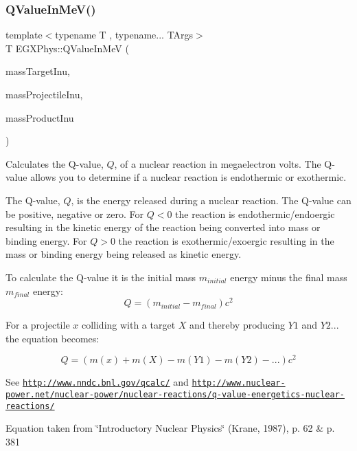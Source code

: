\subsubsection{\texorpdfstring{Q\+Value\+In\+Me\+V()}{QValueInMeV()}}
{\footnotesize\ttfamily template$<$typename T , typename... T\+Args$>$ \\
T E\+G\+X\+Phys\+::\+Q\+Value\+In\+MeV (\begin{DoxyParamCaption}\item[{const T \&}]{mass\+Target\+Inu,  }\item[{const T \&}]{mass\+Projectile\+Inu,  }\item[{const T\+Args \&...}]{mass\+Product\+Inu }\end{DoxyParamCaption})}



Calculates the Q-\/value, $Q$, of a nuclear reaction in megaelectron volts. The Q-\/value allows you to determine if a nuclear reaction is endothermic or exothermic. 

The Q-\/value, $Q$, is the energy released during a nuclear reaction. The Q-\/value can be positive, negative or zero. For $Q < 0$ the reaction is endothermic/endoergic resulting in the kinetic energy of the reaction being converted into mass or binding energy. For $Q > 0$ the reaction is exothermic/exoergic resulting in the mass or binding energy being released as kinetic energy.

To calculate the Q-\/value it is the initial mass $m_{initial}$ energy minus the final mass $m_{final}$ energy\+: \[Q = \left ( m_{initial}-m_{final}\right ) c^2\]

For a projectile $x$ colliding with a target $X$ and thereby producing $Y1$ and $Y2...$ the equation becomes\+:

\[Q = \left ( m(x) + m(X) - m(Y1) - m(Y2) - ... \right ) c^2\]

See \href{http://www.nndc.bnl.gov/qcalc/}{\tt http\+://www.\+nndc.\+bnl.\+gov/qcalc/} and \href{http://www.nuclear-power.net/nuclear-power/nuclear-reactions/q-value-energetics-nuclear-reactions/}{\tt http\+://www.\+nuclear-\/power.\+net/nuclear-\/power/nuclear-\/reactions/q-\/value-\/energetics-\/nuclear-\/reactions/}

Equation taken from \char`\"{}\+Introductory Nuclear Physics\char`\"{} (Krane, 1987), p. 62 \& p. 381



